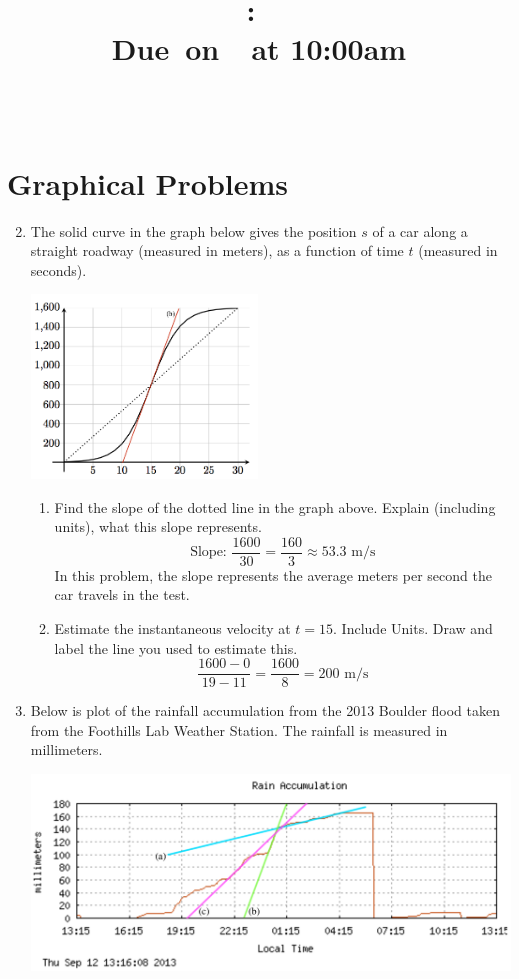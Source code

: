 \documentclass{article}
\title{
    \vspace{2in}
    \textmd{\textbf{\hmwkClass:\ \hmwkTitle}}\\
    \normalsize\vspace{0.1in}\small{Due\ on\ \hmwkDueDate\ at 10:00am}\\
    \vspace{0.1in}\large{\textit{\hmwkClassInstructor\ \hmwkClassTime}}
    \vspace{3in}
}
\author{\hmwkAuthorName}
\date{}
\begin{document}
\maketitle

\pagebreak

\section{Graphical Problems}

\begin{enumerate}
\setcounter{enumi}{1}

\item The solid curve in the graph below gives the position $s$ of a car along a straight roadway (measured in meters), as a function of time $t$ (measured in seconds).

\begin{center}\includegraphics[width=6cm]{images/hw2add}\end{center}

	\begin{enumerate}
		\item Find the slope of the dotted line in the graph above. Explain (including units), what this slope represents.
		$$\text{Slope: }\frac{1600}{30}=\frac{160}{3}\approx 53.3 \text{ m/s}$$ In this problem, the slope represents the average meters per second the car travels in the test.
		\item Estimate the instantaneous velocity at $t=15$. Include Units. Draw and label the line you used to estimate this.
		$$\frac{1600-0}{19-11}=\frac{1600}{8}=200\text{ m/s}$$
	\end{enumerate}
	
\item Below is plot of the rainfall accumulation from the 2013 Boulder flood taken from the Foothills Lab Weather Station. The rainfall is measured in millimeters.

\begin{center}\includegraphics[width=0.8\linewidth]{images/boulderfloodgraph}\end{center}


\end{enumerate}
\end{document}
